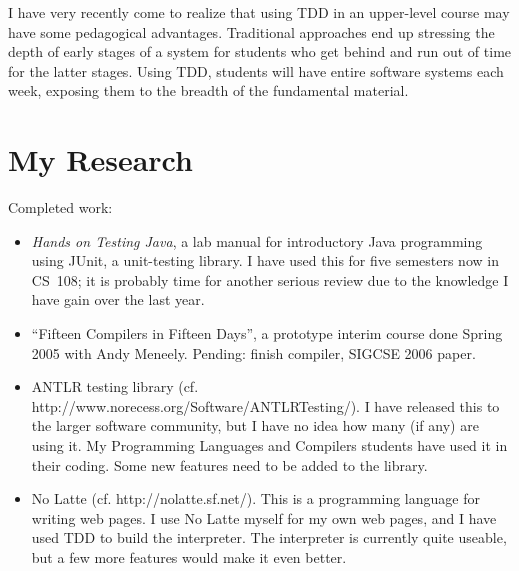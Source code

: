 \documentclass{article}
\begin{document}
I have very recently come to realize that using TDD in an upper-level course may have some pedagogical advantages.  Traditional approaches end up stressing the depth of early stages of a system for students who get behind and run out of time for the latter stages.  Using TDD, students will have entire software systems each week, exposing them to the breadth of the fundamental material.

\section*{My Research}

Completed work:
\begin{itemize}
\item \textit{Hands on Testing Java}, a lab manual for introductory Java programming using JUnit, a unit-testing library.  I have used this for five semesters now in CS~108; it is probably time for another serious review due to the knowledge I have gain over the last year.
\item ``Fifteen Compilers in Fifteen Days'', a prototype interim course done Spring 2005 with Andy Meneely.  Pending: finish compiler, SIGCSE 2006 paper.
\item ANTLR testing library (cf. http://www.norecess.org/Software/ANTLRTesting/).  I have released this to the larger software community, but I have no idea how many (if any) are using it.  My Programming Languages and Compilers students have used it in their coding.  Some new features need to be added to the library.
\item No Latte (cf. http://nolatte.sf.net/).  This is a programming language for writing web pages.  I use No Latte myself for my own web pages, and I have used TDD to build the interpreter.  The interpreter is currently quite useable, but a few more features would make it even better.
\end{itemize}
\end{document}
